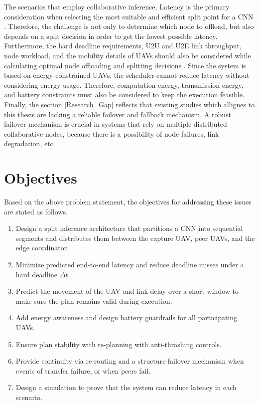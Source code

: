 The scenarios that employ collaborative inference, Latency is the primary consideration when selecting the most suitable and efficient split point for a CNN \cite{Mu2024FineGrain}. Therefore, the challenge is not only to determine which node to offload, but also depends on a split decision in order to get the lowest possible latency. Furthermore, the hard deadline requirements, U2U and U2E link throughput, node workload, and the mobility details of UAVs should also be considered while calculating optimal node offloading and splitting decisions  \cite{Suganya2024DTOE}\cite{demir2024}. Since the system is based on energy-constrained UAVs, the scheduler cannot reduce latency without considering energy usage. Therefore, computation energy, transmission energy, and battery constraints must also be considered to keep the execution feasible.\\

Finally, the section \ref{Research_Gap} reflects that existing studies which allignes to this thesis are lacking a reliable failover and fallback mechanism. A robust failover mechanism is crucial in systems that rely on multiple distributed collaborative nodes, because there is a possibility of node failures, link degradation, etc.


\section{Objectives}
Based on the above problem statement, the objectives for addressing these issues are stated as follows.

\begin{enumerate}
	\item Design a split inference architecture that partitions a CNN into sequential segments and distributes them between the capture UAV, peer UAVs, and the edge coordinator.
	
	\item Minimize predicted end-to-end latency and reduce deadline misses under a hard deadline $\Delta t$.
	
	\item Predict the movement of the UAV and link delay over a short window to make sure the plan remains valid during execution.
	
	\item Add energy awareness and design battery guardrails for all participating UAVs.
	
	\item Ensure plan stability with re-planning with anti-thrashing controls.
	
	\item Provide continuity via re-routing and a structure failover mechanism when events of transfer failure, or when peers fail.
	
	\item Design a simulation to prove that the system can reduce latency in each scenario.
\end{enumerate}
